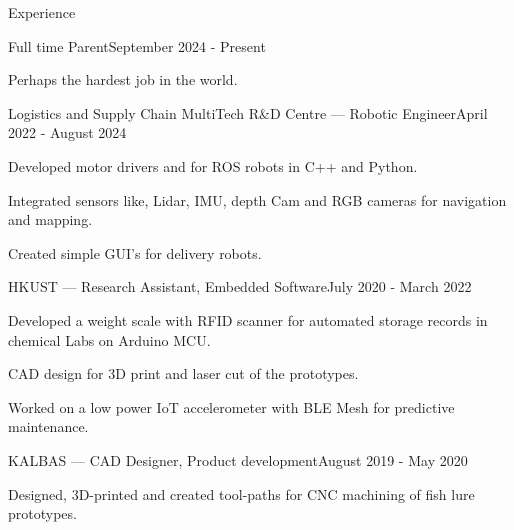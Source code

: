 \documentclass[
	a4paper, %
	11pt, %
]{resume} %
\begin{document}
\begin{rSection}{Experience}

	\begin{rSubsection}{Full time Parent}{September 2024 - Present}{}{}
		\item Perhaps the hardest job in the world.
	\end{rSubsection}


	\begin{rSubsection}{Logistics and Supply Chain MultiTech R\&D Centre --- Robotic Engineer}{April 2022 - August 2024}{}{}
		\item Developed motor drivers and for ROS robots in C++ and Python.
		\item Integrated sensors like, Lidar, IMU, depth Cam and RGB cameras for navigation and mapping.
		\item Created simple GUI's for delivery robots.
	\end{rSubsection}


	\begin{rSubsection}{HKUST --- Research Assistant, Embedded Software}{July 2020 - March 2022}{}{}
		\item Developed a weight scale with RFID scanner for automated storage records in chemical Labs on Arduino MCU.
		\item CAD design for 3D print and laser cut of the prototypes.
		\item Worked on a low power IoT accelerometer with BLE Mesh for predictive maintenance.
	\end{rSubsection}


	\begin{rSubsection}{KALBAS --- CAD Designer, Product development}{August 2019 - May 2020}{}{}
		\item Designed, 3D-printed and created tool-paths for CNC machining of fish lure prototypes.
	\end{rSubsection}

\end{rSection}


\end{document}
